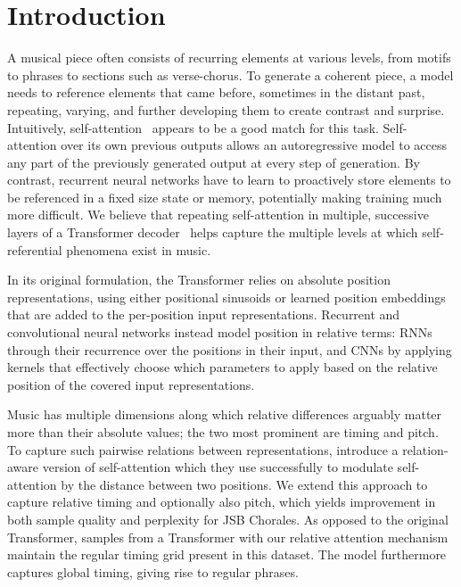 \documentclass{article} \usepackage{iclr2019_conference,times}
\begin{document}
\section{Introduction}
A musical piece often consists of recurring elements at various levels, from motifs to phrases to sections such as verse-chorus. To generate a coherent piece, a model needs to reference elements that came before, sometimes in the distant past, repeating, varying, and further developing them to create contrast and surprise.
Intuitively, self-attention~\citep{parikh2016decomposable} appears to be a good match for this task. Self-attention over its own previous outputs allows an autoregressive model to access any part of the previously generated output at every step of generation. By contrast, recurrent neural networks have to learn to proactively store elements to be referenced in a fixed size state or memory, potentially making training much more difficult.
We believe that repeating self-attention in multiple, successive layers of a Transformer decoder~\citep{vaswani2017attention} helps capture the multiple levels at which self-referential phenomena exist in music.



In its original formulation, the Transformer relies on absolute position representations, using either positional sinusoids or learned position embeddings that are added to the per-position input representations. Recurrent and convolutional neural networks instead
model position in relative terms: RNNs through their recurrence over the positions in their input, and CNNs by applying kernels that effectively choose which parameters to apply based on the relative position of the covered input representations.

Music has multiple dimensions along which relative differences arguably matter more than their absolute values; the two most prominent are timing and pitch. To capture such pairwise relations between representations, \citet{shaw2018self} introduce a relation-aware version of self-attention which they use successfully to modulate self-attention by the distance between two positions. We extend this approach to capture relative timing and optionally also pitch, which yields improvement in both sample quality and perplexity for JSB Chorales. As opposed to the original Transformer, 
samples from a Transformer with our relative attention mechanism maintain the regular timing grid present in this dataset.
The model furthermore captures global timing, giving rise to regular phrases.
\end{document}
